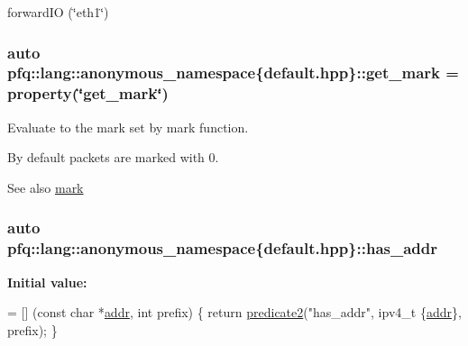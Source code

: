 forward\+I\+O (\char`\"{}eth1\char`\"{}) \hypertarget{namespacepfq_1_1lang_1_1anonymous__namespace_02default_8hpp_03_ab733e24b3ca86450bea0b0888a6327d2}{
\subsubsection[{get\+\_\+mark}]{\setlength{\rightskip}{0pt plus 5cm}auto pfq\+::lang\+::anonymous\+\_\+namespace\{default.\+hpp\}\+::get\+\_\+mark = {\bf property}(\char`\"{}get\+\_\+mark\char`\"{})}}\label{namespacepfq_1_1lang_1_1anonymous__namespace_02default_8hpp_03_ab733e24b3ca86450bea0b0888a6327d2}


Evaluate to the mark set by {\ttfamily mark} function. 

By default packets are marked with 0.

\begin{DoxySeeAlso}{See also}
\hyperlink{namespacepfq_1_1lang_1_1anonymous__namespace_02default_8hpp_03_a7b831baeabda070b89ca862a9445a4a8}{mark} 
\end{DoxySeeAlso}
\hypertarget{namespacepfq_1_1lang_1_1anonymous__namespace_02default_8hpp_03_a74c6b7e812fb3d312ebf534960a6a91d}{
\subsubsection[{has\+\_\+addr}]{\setlength{\rightskip}{0pt plus 5cm}auto pfq\+::lang\+::anonymous\+\_\+namespace\{default.\+hpp\}\+::has\+\_\+addr}}\label{namespacepfq_1_1lang_1_1anonymous__namespace_02default_8hpp_03_a74c6b7e812fb3d312ebf534960a6a91d}
{\bfseries Initial value\+:}
\begin{DoxyCode}
= [] (\textcolor{keyword}{const} \textcolor{keywordtype}{char} *\hyperlink{namespacepfq_1_1lang_1_1anonymous__namespace_02default_8hpp_03_a13cabe468839119d8d68540e3c60718b}{addr}, \textcolor{keywordtype}{int} prefix)
        \{
            \textcolor{keywordflow}{return} \hyperlink{namespacepfq_1_1lang_a7282b9a2e51359b8db0dcdb9fadf2fd1}{predicate2}(\textcolor{stringliteral}{"has\_addr"}, ipv4\_t \{\hyperlink{namespacepfq_1_1lang_1_1anonymous__namespace_02default_8hpp_03_a13cabe468839119d8d68540e3c60718b}{addr}\}, prefix);
        \}
\end{DoxyCode}


